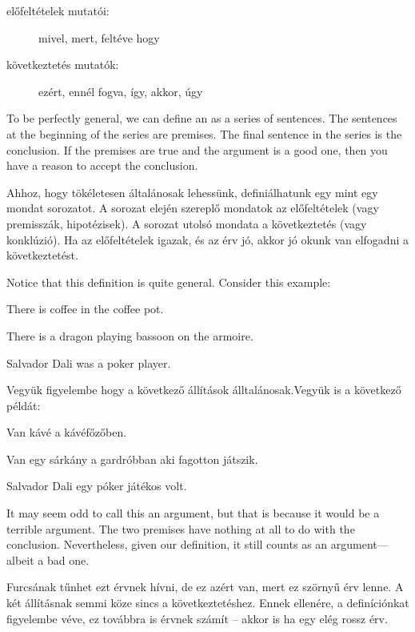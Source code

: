 \begin{description}
\item[előfeltételek mutatói:] mivel, mert, feltéve hogy
\item[következtetés mutatók:] ezért, ennél fogva, így, akkor, úgy
\end{description}


To be perfectly general, we can define an  as a series of sentences. The sentences at the beginning of the series are premises. The final sentence in the series is the conclusion. If the premises are true and the argument is a good one, then you have a reason to accept the conclusion.


Ahhoz, hogy tökéletesen általánosak lehessünk, definiálhatunk egy  mint egy mondat sorozatot. A sorozat elején szereplő mondatok az előfeltételek (vagy premisszák, hipotézisek). A sorozat utolsó mondata a következtetés (vagy konklúzió). Ha az előfeltételek igazak, és az érv jó, akkor jó okunk van elfogadni a következtetést.


Notice that this definition is quite general. Consider this example:
\begin{earg}
\item[] There is coffee in the coffee pot.
\item[] There is a dragon playing bassoon on the armoire.
\item[\therefore] Salvador Dali was a poker player.
\end{earg}


Vegyük figyelembe hogy a következő állítások álltalánosak.Vegyük is a következő példát:
\begin{earg}
\item[] Van kávé a kávéfőzőben.
\item[] Van egy sárkány a gardróbban aki fagotton játszik.
\item[\therefore] Salvador Dali egy póker játékos volt.
\end{earg}


It may seem odd to call this an argument, but that is because it would be a {terrible} argument. The two premises have nothing at all to do with the conclusion. Nevertheless, given our definition, it still counts as an argument--- albeit a bad one.


Furcsának tűnhet ezt érvnek hívni, de ez azért van, mert ez {szörnyű} érv lenne. A két állításnak semmi köze sincs a következtetéshez. Ennek ellenére, a definíciónkat figyelembe véve, ez továbbra is érvnek számít -- akkor is ha egy elég rossz érv.



